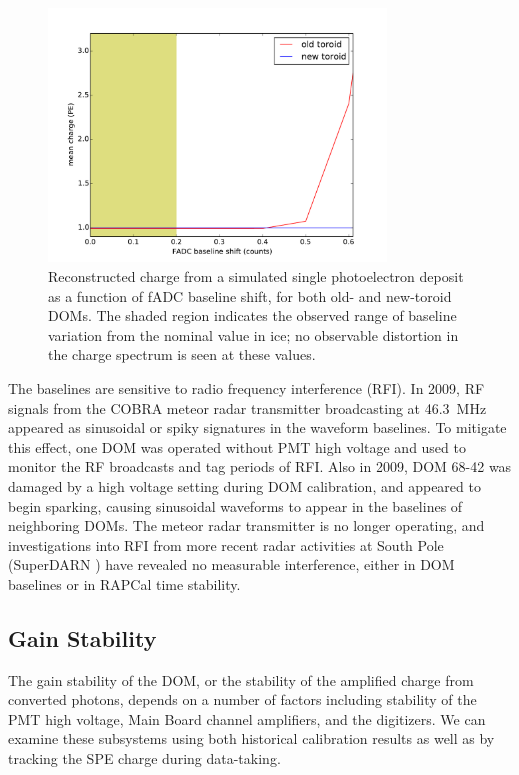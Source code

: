 \begin{figure}[!h]
 \centering
 \includegraphics[width=0.8\textwidth]{graphics/dom/reliability/charge_fadcshift.pdf}
 \caption{Reconstructed charge from a simulated single photoelectron
   deposit as a function of fADC baseline shift, for both old- and
   new-toroid DOMs. The shaded region indicates the observed range of 
   baseline variation from the nominal value in ice; no observable
   distortion in the charge spectrum is seen at these values.}
 \label{fig:charge_fadcshift}
\end{figure}

The baselines are sensitive to radio frequency interference (RFI). In
2009, RF signals from the COBRA meteor radar transmitter broadcasting at
46.3~MHz \cite{meteor_radar}
appeared as sinusoidal or spiky signatures in the waveform
baselines.  To mitigate this effect, one DOM was operated without PMT high
voltage and used to monitor the RF broadcasts and tag periods of RFI.  Also
in 2009, DOM 68-42 was damaged by a high voltage setting during DOM
calibration, and appeared to begin sparking, causing sinusoidal waveforms
to appear in the baselines of neighboring DOMs. The meteor radar
transmitter is no longer operating, and investigations into RFI
from more recent radar activities at South Pole (SuperDARN
\cite{superdarn}) have revealed no measurable interference, either in DOM
baselines or in RAPCal time stability. 

\subsection{\label{sec:gain_stability}Gain Stability}

The gain stability of the DOM, or the stability of the amplified charge
from converted photons, depends on a number of factors including stability
of the PMT high voltage, Main Board channel amplifiers, and the digitizers.
We can examine these subsystems using both historical calibration results
as well as by tracking the SPE charge during data-taking.

